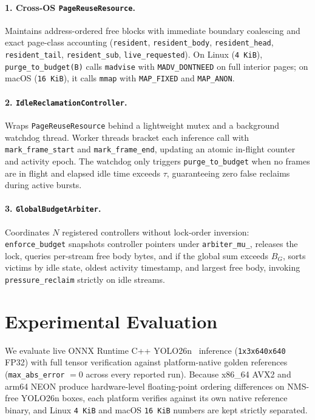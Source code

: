 \documentclass[sigconf,screen]{acmart}
\begin{document}
\paragraph{1. Cross-OS \texttt{PageReuseResource}.} Maintains address-ordered free blocks with immediate boundary coalescing and exact page-class accounting (\texttt{resident}, \texttt{resident\_body}, \texttt{resident\_head}, \texttt{resident\_tail}, \texttt{resident\_sub}, \texttt{live\_requested}). On Linux (\texttt{4~KiB}), \texttt{purge\_to\_budget(B)} calls \texttt{madvise} with \texttt{MADV\_DONTNEED} on full interior pages; on macOS (\texttt{16~KiB}), it calls \texttt{mmap} with \texttt{MAP\_FIXED} and \texttt{MAP\_ANON}.

\paragraph{2. \texttt{IdleReclamationController}.} Wraps \texttt{PageReuseResource} behind a lightweight mutex and a background watchdog thread. Worker threads bracket each inference call with \texttt{mark\_frame\_start} and \texttt{mark\_frame\_end}, updating an atomic in-flight counter and activity epoch. The watchdog only triggers \texttt{purge\_to\_budget} when no frames are in flight and elapsed idle time exceeds $\tau$, guaranteeing zero false reclaims during active bursts.

\paragraph{3. \texttt{GlobalBudgetArbiter}.} Coordinates $N$ registered controllers without lock-order inversion: \texttt{enforce\_budget} snapshots controller pointers under \texttt{arbiter\_mu\_}, releases the lock, queries per-stream free body bytes, and if the global sum exceeds $B_G$, sorts victims by idle state, oldest activity timestamp, and largest free body, invoking \texttt{pressure\_reclaim} strictly on idle streams.

\section{Experimental Evaluation}
\label{sec:eval}

We evaluate live ONNX Runtime C++ YOLO26n~\cite{ultralytics2026yolo26} inference (\texttt{1x3x640x640} FP32) with full tensor verification against platform-native golden references (\texttt{max\_abs\_error} $= 0$ across every reported run). Because x86\_64 AVX2 and arm64 NEON produce hardware-level floating-point ordering differences on NMS-free YOLO26n boxes, each platform verifies against its own native reference binary, and Linux \texttt{4~KiB} and macOS \texttt{16~KiB} numbers are kept strictly separated.
\end{document}
